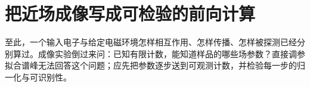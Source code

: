 \chapter{把近场成像写成可检验的前向计算}
\label{chap:feqo-imaging}

至此，一个输入电子与给定电磁环境怎样相互作用、怎样传播、怎样被探测已经分别算过。成像实验倒过来问：已知有限计数，能知道样品的哪些场参数？直接调参拟合谱峰无法回答这个问题；应先把参数逐步送到可观测计数，并检验每一步的归一化与可识别性。


